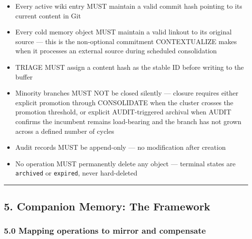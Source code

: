 \documentclass[
  11pt,
]{article}
\providecommand{\tightlist}{%
  \setlength{\itemsep}{0pt}\setlength{\parskip}{0pt}}
\begin{document}
\begin{itemize}
\tightlist
\item
  Every active wiki entry MUST maintain a valid commit hash pointing to
  its current content in Git
\item
  Every cold memory object MUST maintain a valid linkout to its original
  source --- this is the non-optional commitment CONTEXTUALIZE makes
  when it processes an external source during scheduled consolidation
\item
  TRIAGE MUST assign a content hash as the stable ID before writing to
  the buffer
\item
  Minority branches MUST NOT be closed silently --- closure requires
  either explicit promotion through CONSOLIDATE when the cluster crosses
  the promotion threshold, or explicit AUDIT-triggered archival when
  AUDIT confirms the incumbent remains load-bearing and the branch has
  not grown across a defined number of cycles
\item
  Audit records MUST be append-only --- no modification after creation
\item
  No operation MUST permanently delete any object --- terminal states
  are \texttt{archived} or \texttt{expired}, never hard-deleted
\end{itemize}

\begin{center}\rule{0.5\linewidth}{0.5pt}\end{center}

\hypertarget{companion-memory-the-framework}{%
\subsection{5. Companion Memory: The
Framework}\label{companion-memory-the-framework}}

\hypertarget{mapping-operations-to-mirror-and-compensate}{%
\subsubsection{5.0 Mapping operations to mirror and
compensate}\label{mapping-operations-to-mirror-and-compensate}}
\end{document}
